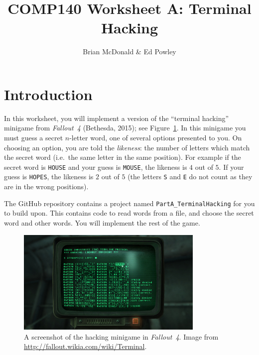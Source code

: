 \documentclass{../../../fal_assignment}
\title{COMP140 Worksheet A: Terminal Hacking}
\author{Brian McDonald \& Ed Powley}
\begin{document}
\maketitle

\section*{Introduction}

In this worksheet, you will implement a version of the ``terminal hacking'' minigame from \emph{Fallout~4} (Bethesda, 2015); see Figure~\ref{fig:fallout_terminal}.
In this minigame you must guess a secret $n$-letter word, one of several options presented to you.
On choosing an option, you are told the \emph{likeness}: the number of letters which match the secret word (i.e.\ the same letter in the same position).
For example if the secret word is \texttt{HOUSE} and your guess is \texttt{MOUSE}, the likeness is $4$ out of $5$.
If your guess is \texttt{HOPES}, the likeness is $2$ out of $5$ (the letters \texttt{S} and \texttt{E} do not count as they are in the wrong positions).

The GitHub repository contains a project named \texttt{PartA\_TerminalHacking} for you to build upon.
This contains code to read words from a file, and choose the secret word and other words.
You will implement the rest of the game.


\begin{figure}[!h]
  	\centering
	\includegraphics[width=0.8\textwidth]{fallout_terminal.jpg}
	\caption{A screenshot of the hacking minigame in \emph{Fallout~4}.
		Image from \protect\url{http://fallout.wikia.com/wiki/Terminal}.}
	\label{fig:fallout_terminal}
\end{figure}

\section{} \label{core-a-first}
\end{document}
